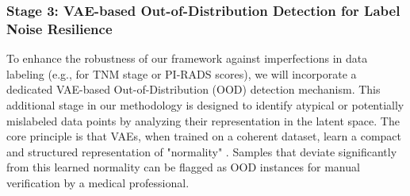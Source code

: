 \documentclass[11pt, a4paper]{article}
\begin{document}
\subsubsection{Stage 3: VAE-based Out-of-Distribution Detection for Label Noise Resilience}
To enhance the robustness of our framework against imperfections in data labeling (e.g., for TNM stage or PI-RADS scores), we will incorporate a dedicated VAE-based Out-of-Distribution (OOD) detection mechanism. This additional stage in our methodology is designed to identify atypical or potentially mislabeled data points by analyzing their representation in the latent space. The core principle is that VAEs, when trained on a coherent dataset, learn a compact and structured representation of "normality" \cite{PuglisiAlexander2025,YuanStojanovski2025}. Samples that deviate significantly from this learned normality can be flagged as OOD instances for manual verification by a medical professional.
\end{document}
